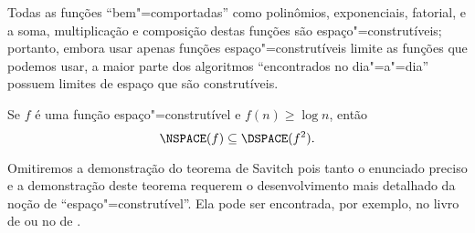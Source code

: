 Todas as funções ``bem"=comportadas'' como polinômios,
exponenciais, fatorial, e a soma, multiplicação e composição destas funções
são espaço"=construtíveis;
portanto,
embora usar apenas funções espaço"=construtíveis limite
as funções que podemos usar,
a maior parte dos algoritmos ``encontrados no dia"=a"=dia''
possuem limites de espaço que são construtíveis.

\begin{utheorem}
    Se $f$ é uma função espaço"=construtível e $f(n) \geq \log n$,
    então
    \begin{equation*}
        \NSPACE(f) \subseteq \DSPACE(f^2).
    \end{equation*}
\end{utheorem}

Omitiremos a demonstração do teorema de Savitch
pois tanto o enunciado preciso e a demonstração deste teorema
requerem o desenvolvimento mais detalhado da noção de
``espaço"=construtível''.
Ela pode ser encontrada, por exemplo,
no livro de 
ou no de .
